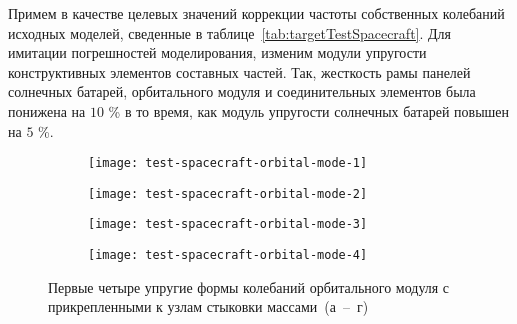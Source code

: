 Примем в качестве целевых значений коррекции частоты собственных колебаний исходных моделей, сведенные в таблице~\ref{tab:targetTestSpacecraft}. Для имитации погрешностей моделирования, изменим модули упругости конструктивных элементов составных частей. Так, жесткость рамы панелей солнечных батарей, орбитального модуля и соединительных элементов была понижена на $ 10 $ \% в то время, как модуль упругости солнечных батарей повышен на $ 5 $ \%.

\def\sfSpacecraft{0.48\textwidth}

\begin{figure}[!htb]
	\centering
	\begin{subfigure}[t]{\sfSpacecraft}
		\centering
		\texttt{[image: test-spacecraft-orbital-mode-1]}
		\caption{} 
	\end{subfigure}
	\hfill
	\begin{subfigure}[t]{\sfSpacecraft}
		\centering
		\texttt{[image: test-spacecraft-orbital-mode-2]}
		\caption{} 
	\end{subfigure}	
	\begin{subfigure}[t]{\sfSpacecraft}
		\centering
		\texttt{[image: test-spacecraft-orbital-mode-3]}
		\caption{} 
	\end{subfigure}	
	\hfill
	\begin{subfigure}[t]{\sfSpacecraft}
		\centering
		\texttt{[image: test-spacecraft-orbital-mode-4]}
		\caption{} 
	\end{subfigure}	
	\caption{Первые четыре упругие формы колебаний орбитального модуля с прикрепленными к узлам стыковки массами~(а~--~г)} \label{fig:test-spacecraft-orbital-mode} 
\end{figure}

